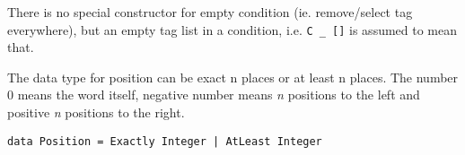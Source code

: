 \documentclass[a4paper, 11pt]{article}
\begin{document}
There is no special constructor for empty condition (ie. remove/select tag everywhere), but an empty tag list in a condition, i.e. \texttt{C \_ []} is assumed to mean that.

The data type for position can be exact n places or at least n places. The number 0 means the word itself, negative number means \emph{n} positions to the left and positive \emph{n} positions to the right.

\begin{lstlisting}
data Position = Exactly Integer | AtLeast Integer
 \end{lstlisting}



%
%
\end{document}
